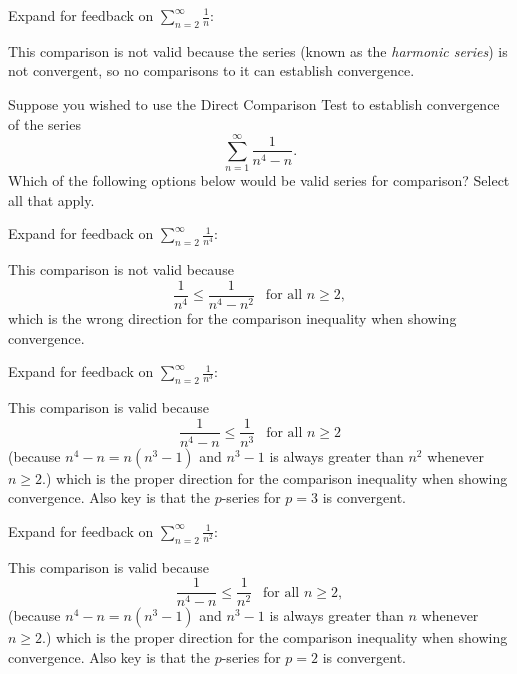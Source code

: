 \documentclass{ximera}
\begin{document}
\begin{exercise}
\begin{feedback}
Expand for feedback on {$\displaystyle \sum_{n=2}^\infty \frac{1}{n}$}:
\begin{expandable}
This comparison is not valid because the series (known as the \textit{harmonic series}) is not convergent, so no comparisons to it can establish convergence.
\end{expandable}
\end{feedback}
\end{exercise}


\begin{exercise}
Suppose you wished to use the Direct Comparison Test to establish convergence of the series
\[ \sum_{n=1}^\infty \frac{1}{n^4 - n}. \]
Which of the following options below would be valid series for comparison? Select all that apply.
\begin{selectAll}
\end{selectAll}
\begin{feedback}
Expand for feedback on {$\displaystyle \sum_{n=2}^\infty \frac{1}{n^4}$}:
\begin{expandable}
This comparison is not valid because
\[ \frac{1}{n^4} \leq \frac{1}{n^4-n^2}  \ \ \text{ for all } n \geq 2,\]
which is the wrong direction for the comparison inequality when showing convergence.
\end{expandable}

Expand for feedback on {$\displaystyle \sum_{n=2}^\infty \frac{1}{n^3}$}:
\begin{expandable}
This comparison is valid because
\[ \frac{1}{n^4-n} \leq \frac{1}{n^3}  \ \ \text{ for all } n \geq 2 \]
(because $n^4 - n = n(n^3-1)$ and $n^3 - 1$ is always greater than $n^2$ whenever $n \geq 2$.)
which is the proper direction for the comparison inequality when showing convergence. Also key is that the $p$-series for $p=3$ is convergent.
\end{expandable}

Expand for feedback on {$\displaystyle \sum_{n=2}^\infty \frac{1}{n^2}$}:
\begin{expandable}
This comparison is valid because
\[ \frac{1}{n^4-n} \leq \frac{1}{n^2}  \ \ \text{ for all } n \geq 2, \]
(because $n^4 - n = n(n^3-1)$ and $n^3 - 1$ is always greater than $n$ whenever $n \geq 2$.)
which is the proper direction for the comparison inequality when showing convergence. Also key is that the $p$-series for $p=2$ is convergent.
\end{expandable}

\end{feedback}
\end{exercise}
\end{document}
